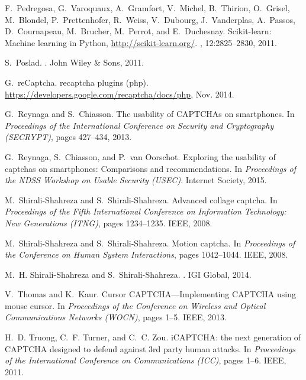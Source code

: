 \documentclass[conference]{IEEEtran}
\begin{document}
\begin{thebibliography}{10}
F.~Pedregosa, G.~Varoquaux, A.~Gramfort, V.~Michel, B.~Thirion, O.~Grisel,
  M.~Blondel, P.~Prettenhofer, R.~Weiss, V.~Dubourg, J.~Vanderplas, A.~Passos,
  D.~Cournapeau, M.~Brucher, M.~Perrot, and E.~Duchesnay.
\newblock Scikit-learn: Machine learning in {P}ython,
  \url{http://scikit-learn.org/}.
, 12:2825--2830, 2011.

S.~Poslad.
.
\newblock John Wiley \& Sons, 2011.

G.~reCaptcha.
\newblock recaptcha plugins (php).
\newblock \url{https://developers.google.com/recaptcha/docs/php}, Nov. 2014.

G.~Reynaga and S.~Chiasson.
\newblock The usability of {CAPTCHA}s on smartphones.
\newblock In {\em Proceedings of the International Conference on Security and
  Cryptography (SECRYPT)}, pages 427--434, 2013.

G.~Reynaga, S.~Chiasson, and P.~van Oorschot.
\newblock Exploring the usability of captchas on smartphones: Comparisons and
  recommendations.
\newblock In {\em Proceedings of the NDSS Workshop on Usable Security (USEC)}.
  Internet Society, 2015.

M.~Shirali-Shahreza and S.~Shirali-Shahreza.
\newblock Advanced collage captcha.
\newblock In {\em Proceedings of the Fifth International Conference on
  Information Technology: New Generations (ITNG)}, pages 1234--1235. IEEE,
  2008.

M.~Shirali-Shahreza and S.~Shirali-Shahreza.
\newblock Motion captcha.
\newblock In {\em Proceedings of the Conference on Human System Interactions},
  pages 1042--1044. IEEE, 2008.

M.~H. Shirali-Shahreza and S.~Shirali-Shahreza.
.
\newblock IGI Global, 2014.

V.~Thomas and K.~Kaur.
\newblock Cursor {CAPTCHA}—{I}mplementing {CAPTCHA} using mouse cursor.
\newblock In {\em Proceedings of the Conference on Wireless and Optical
  Communications Networks (WOCN)}, pages 1--5. IEEE, 2013.

H.~D. Truong, C.~F. Turner, and C.~C. Zou.
\newblock i{CAPTCHA}: the next generation of {CAPTCHA} designed to defend
  against 3rd party human attacks.
\newblock In {\em Proceedings of the International Conference on Communications
  (ICC)}, pages 1--6. IEEE, 2011.


\end{thebibliography}
\end{document}
